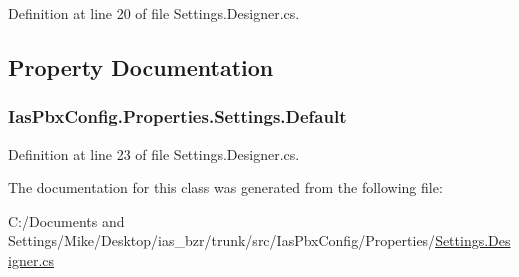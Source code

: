 Definition at line 20 of file Settings.Designer.cs.

\subsection{Property Documentation}
\hypertarget{class_ias_pbx_config_1_1_properties_1_1_settings_a4258658fd8efaea7976b65ef9b54381c}{
\subsubsection[{Default}]{ IasPbxConfig.Properties.Settings.Default}}
\label{class_ias_pbx_config_1_1_properties_1_1_settings_a4258658fd8efaea7976b65ef9b54381c}


Definition at line 23 of file Settings.Designer.cs.

The documentation for this class was generated from the following file:\begin{DoxyCompactItemize}
\item 
C:/Documents and Settings/Mike/Desktop/ias\_\-bzr/trunk/src/IasPbxConfig/Properties/\hyperlink{_settings_8_designer_8cs}{Settings.Designer.cs}\end{DoxyCompactItemize}
